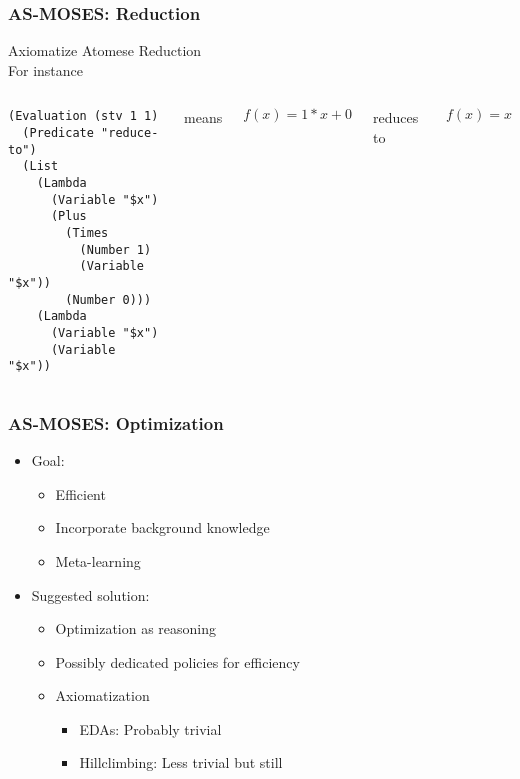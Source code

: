 \documentclass{beamer}
\begin{document}
\begin{frame}[fragile]
  \frametitle{AS-MOSES: Reduction}

\alert{Axiomatize Atomese Reduction}\\[0.5cm]

For instance
\begin{columns}

\column{2in}
  
{\tiny
\begin{verbatim}
(Evaluation (stv 1 1)
  (Predicate "reduce-to")
  (List
    (Lambda
      (Variable "$x")
      (Plus
        (Times
          (Number 1)
          (Variable "$x"))
        (Number 0)))
    (Lambda
      (Variable "$x")
      (Variable "$x"))
\end{verbatim}}

\column{0.5in}
  
{\tiny means}

\column{2in}

$$f(x) = 1*x + 0$$

\begin{center}{\tiny reduces to}\end{center}

$$f(x) = x$$

\end{columns}

\end{frame}

\begin{frame}
  \frametitle{AS-MOSES: Optimization}

  \begin{itemize}
  \item<+-> Goal:
    \begin{itemize}
    \item Efficient
    \item Incorporate \alert{background knowledge}
    \item Meta-learning
    \end{itemize}
  \item<+-> Suggested solution:
    \begin{itemize}
    \item Optimization as \alert{reasoning}
    \item Possibly dedicated policies for efficiency
    \item Axiomatization
      \begin{itemize}
      \item EDAs: Probably trivial
      \item Hillclimbing: Less trivial but still
      \end{itemize}
    \end{itemize}
  \end{itemize}
\end{frame}
\end{document}
